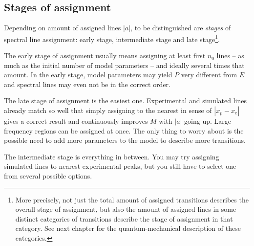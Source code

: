 \documentclass[11pt]{article}
\begin{document}


\subsection{Stages of assignment}

Depending on amount of assigned lines $|a|$, to be distinguished are \emph{stages} of spectral line assignment: early stage, intermediate stage and late stage\footnote{More precisely, not just the total amount of assigned transitions describes the overall stage of assignment, but also the amount of assigned lines in some distinct categories of transitions describe the stage of assignment in that category. See next chapter for the quantum-mechanical description of these categories.}.

The early stage of assignment usually means assigning at least first $n_0$ lines -- as much as the initial number of model parameters -- and ideally several times that amount. In the early stage, model parameters may yield $P$ very different from $E$ and spectral lines may even not be in the correct order. 

The late stage of assignment is the easiest one. Experimental and simulated lines already match so well that simply assigning to the nearest in sense of $|x_p - x_e|$ gives a correct result and continuously improves $M$ with $|a|$ going up. Large frequency regions can be assigned at once. The only thing to worry about is the possible need to add more parameters to the model to describe more transitions.  

The intermediate stage is everything in between. You may try assigning simulated lines to nearest experimental peaks, but you still have to select one from several possible options.
\end{document}
